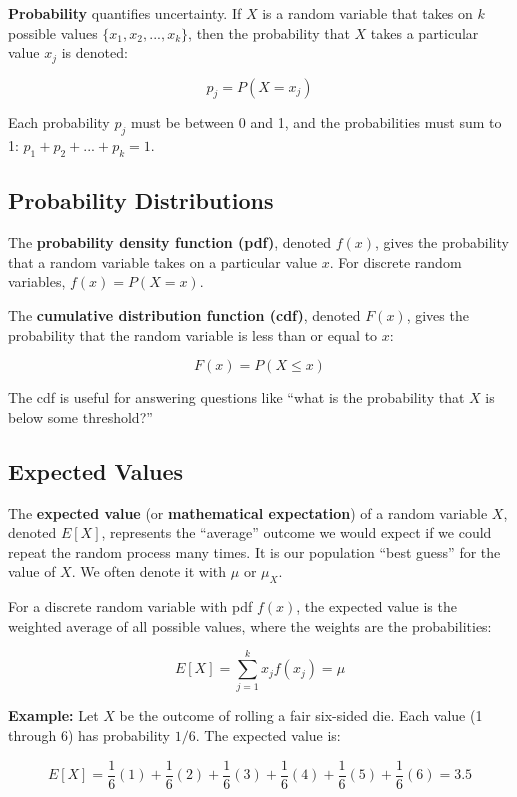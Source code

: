 \documentclass[
  letterpaper,
  DIV=11,
  numbers=noendperiod]{scrreprt}
\begin{document}
\textbf{Probability} quantifies uncertainty. If \(X\) is a random
variable that takes on \(k\) possible values \(\{x_1, x_2, ..., x_k\}\),
then the probability that \(X\) takes a particular value \(x_j\) is
denoted:

\[
p_j = P(X = x_j)
\]

Each probability \(p_j\) must be between 0 and 1, and the probabilities
must sum to 1: \(p_1 + p_2 + ... + p_k = 1\).

\subsection{Probability Distributions}\label{probability-distributions}

The \textbf{probability density function (pdf)}, denoted \(f(x)\), gives
the probability that a random variable takes on a particular value
\(x\). For discrete random variables, \(f(x) = P(X = x)\).

The \textbf{cumulative distribution function (cdf)}, denoted \(F(x)\),
gives the probability that the random variable is less than or equal to
\(x\):

\[
F(x) = P(X \leq x)
\]

The cdf is useful for answering questions like ``what is the probability
that \(X\) is below some threshold?''

\subsection{Expected Values}\label{expected-values}

The \textbf{expected value} (or \textbf{mathematical expectation}) of a
random variable \(X\), denoted \(E[X]\), represents the ``average''
outcome we would expect if we could repeat the random process many
times. It is our population ``best guess'' for the value of \(X\). We
often denote it with \(\mu\) or \(\mu_X\).

For a discrete random variable with pdf \(f(x)\), the expected value is
the weighted average of all possible values, where the weights are the
probabilities:

\[
E[X] = \sum_{j=1}^{k} x_j f(x_j) = \mu
\]

\textbf{Example:} Let \(X\) be the outcome of rolling a fair six-sided
die. Each value (1 through 6) has probability \(1/6\). The expected
value is:

\[
E[X] = \frac{1}{6}(1) + \frac{1}{6}(2) + \frac{1}{6}(3) + \frac{1}{6}(4) + \frac{1}{6}(5) + \frac{1}{6}(6) = 3.5
\]
\end{document}
